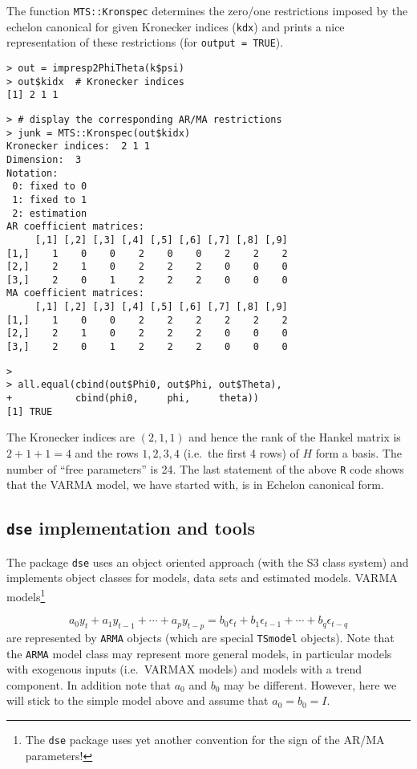 \documentclass[]{article}
\let\rmarkdownfootnote\footnote%
\def\footnote{\protect\rmarkdownfootnote}
\begin{document}
The function \texttt{MTS::Kronspec} determines the zero/one restrictions
imposed by the echelon canonical for given Kronecker indices
(\texttt{kdx}) and prints a nice representation of these restrictions
(for \texttt{output\ =\ TRUE}).

\begin{verbatim}
> out = impresp2PhiTheta(k$psi)
> out$kidx  # Kronecker indices
[1] 2 1 1
\end{verbatim}

\begin{verbatim}
> # display the corresponding AR/MA restrictions
> junk = MTS::Kronspec(out$kidx) 
Kronecker indices:  2 1 1 
Dimension:  3 
Notation:  
 0: fixed to 0 
 1: fixed to 1 
 2: estimation 
AR coefficient matrices:  
     [,1] [,2] [,3] [,4] [,5] [,6] [,7] [,8] [,9]
[1,]    1    0    0    2    0    0    2    2    2
[2,]    2    1    0    2    2    2    0    0    0
[3,]    2    0    1    2    2    2    0    0    0
MA coefficient matrices:  
     [,1] [,2] [,3] [,4] [,5] [,6] [,7] [,8] [,9]
[1,]    1    0    0    2    2    2    2    2    2
[2,]    2    1    0    2    2    2    0    0    0
[3,]    2    0    1    2    2    2    0    0    0
\end{verbatim}

\begin{verbatim}
> 
> all.equal(cbind(out$Phi0, out$Phi, out$Theta),
+           cbind(phi0,     phi,     theta))
[1] TRUE
\end{verbatim}

The Kronecker indices are \((2,1,1)\) and hence the rank of the Hankel
matrix is \(2+1+1=4\) and the rows \(1,2,3,4\) (i.e.~the first 4 rows)
of \(H\) form a basis. The number of ``free parameters'' is 24. The last
statement of the above \texttt{R} code shows that the VARMA model, we
have started with, is in Echelon canonical form.

\subsection{\texorpdfstring{\texttt{dse} implementation and
tools}{dse implementation and tools}}\label{dse-implementation-and-tools}

The package \texttt{dse} uses an object oriented approach (with the S3
class system) and implements object classes for models, data sets and
estimated models. VARMA models\footnote{The \texttt{dse} package uses
  yet another convention for the sign of the AR/MA parameters!}

\[
a_0 y_t + a_1 y_{t-1} + \cdots + a_p y_{t-p} = b_0 \epsilon_t + b_1 \epsilon_{t-1} + \cdots + b_q \epsilon_{t-q} 
\] are represented by \texttt{ARMA} objects (which are special
\texttt{TSmodel} objects). Note that the \texttt{ARMA} model class may
represent more general models, in particular models with exogenous
inputs (i.e.~VARMAX models) and models with a trend component. In
addition note that \(a_0\) and \(b_0\) may be different. However, here
we will stick to the simple model above and assume that \(a_0=b_0=I\).
\end{document}
